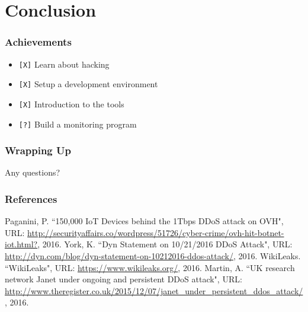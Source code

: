 \documentclass[10pt]{beamer}
\begin{document}
  \section[End]{Conclusion}
  \begin{frame}
    \frametitle{Achievements}
    \begin{itemize}
      \item \texttt{[X]} Learn about hacking
      \item \texttt{[X]} Setup a development environment
      \item \texttt{[X]} Introduction to the tools
      \item \texttt{[?]} Build a monitoring program
    \end{itemize}
  \end{frame}
  \begin{frame}
    \frametitle{Wrapping Up}
    \begin{block}{}
      \centering
      Any questions?
    \end{block}
  \end{frame}
  \begin{frame}
    \frametitle{References}
    \begin{thebibliography}{}
        Paganini, P.
        ``150,000 IoT Devices behind the 1Tbps DDoS attack on OVH",
        URL: \url{http://securityaffairs.co/wordpress/51726/cyber-crime/ovh-hit-botnet-iot.html?},
        2016.
        York, K.
        ``Dyn Statement on 10/21/2016 DDoS Attack",
        URL: \url{http://dyn.com/blog/dyn-statement-on-10212016-ddos-attack/},
        2016.
        WikiLeaks.
        ``WikiLeaks",
        URL: \url{https://www.wikileaks.org/},
        2016.
        Martin, A.
        ``UK research network Janet under ongoing and persistent DDoS attack",
        URL: \url{http://www.theregister.co.uk/2015/12/07/janet_under_persistent_ddos_attack/},
        2016.
    \end{thebibliography}
  \end{frame}
\end{document}

